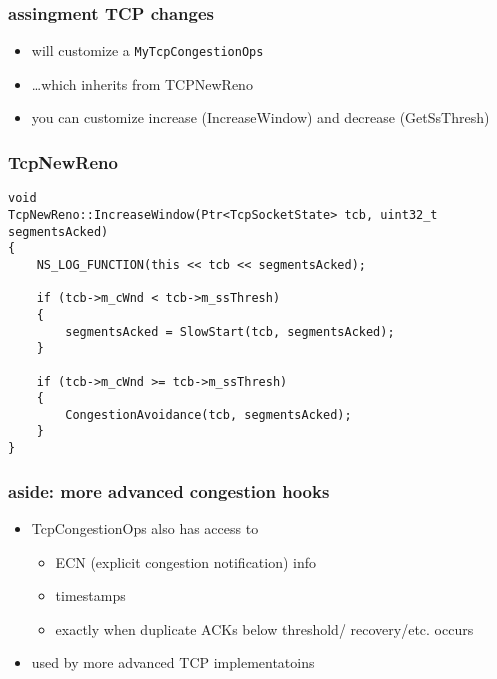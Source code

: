 \begin{frame}\frametitle{assingment TCP changes}
\begin{itemize}
\item will customize a \texttt{MyTcpCongestionOps}
\item \ldots which inherits from TCPNewReno
\vspace{.5cm}
\item you can customize increase (IncreaseWindow) and decrease (GetSsThresh)
\end{itemize}
\end{frame}

\begin{FragileFrame}
\frametitle{TcpNewReno}
\begin{Verbatim}[fontsize=\fontsize{9}{10}]
void
TcpNewReno::IncreaseWindow(Ptr<TcpSocketState> tcb, uint32_t segmentsAcked)
{
    NS_LOG_FUNCTION(this << tcb << segmentsAcked);
 
    if (tcb->m_cWnd < tcb->m_ssThresh)
    {
        segmentsAcked = SlowStart(tcb, segmentsAcked);
    }
 
    if (tcb->m_cWnd >= tcb->m_ssThresh)
    {
        CongestionAvoidance(tcb, segmentsAcked);
    }
}
\end{Verbatim}
\end{FragileFrame}


\begin{frame}\frametitle{aside: more advanced congestion hooks}
\begin{itemize}
\item TcpCongestionOps also has access to
    \begin{itemize}
    \item ECN (explicit congestion notification) info
    \item timestamps
    \item exactly when duplicate ACKs below threshold/ recovery/etc. occurs
    \end{itemize}
\item used by more advanced TCP implementatoins
\end{itemize}
\end{frame}
